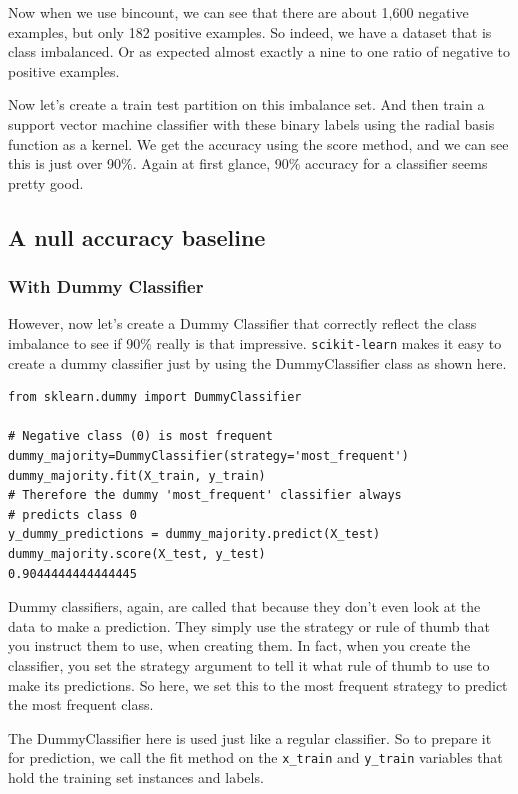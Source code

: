 \begin{multicols}{2}
Now when we use bincount, we can see that there are about 1,600 negative examples, but only 182 positive examples. So indeed, we have a dataset that is class imbalanced. Or as expected almost exactly a nine to one ratio of negative to positive examples. 

Now let's create a train test partition on this imbalance set. And then train a support vector machine classifier with these binary labels using the radial basis function as a kernel. We get the accuracy using the score method, and we can see this is just over 90\%. Again at first glance, 90\% accuracy for a classifier seems pretty good. 

\subsection{A null accuracy baseline}

\subsubsection{With Dummy Classifier}

However, now let's create a Dummy Classifier that correctly reflect the class imbalance to see if 90\% really is that impressive. \texttt{scikit-learn} makes it easy to create a dummy classifier just by using the DummyClassifier class as shown here. 


{\scriptsize
\begin{verbatim}
from sklearn.dummy import DummyClassifier

# Negative class (0) is most frequent
dummy_majority=DummyClassifier(strategy='most_frequent')
dummy_majority.fit(X_train, y_train)
# Therefore the dummy 'most_frequent' classifier always 
# predicts class 0
y_dummy_predictions = dummy_majority.predict(X_test)
dummy_majority.score(X_test, y_test)
0.9044444444444445
\end{verbatim}
}

Dummy classifiers, again, are called that because they don't even look at the data to make a prediction. They simply use the strategy or rule of thumb that you instruct them to use, when creating them. In fact, when you create the classifier, you set the strategy argument to tell it what rule of thumb to use to make its predictions. So here, we set this to the most frequent strategy to predict the most frequent class. 

The DummyClassifier here is used just like a regular classifier. So to prepare it for prediction, we call the fit method on the \texttt{x_train} and \texttt{y_train} variables that hold the training set instances and labels. 


\end{multicols}
